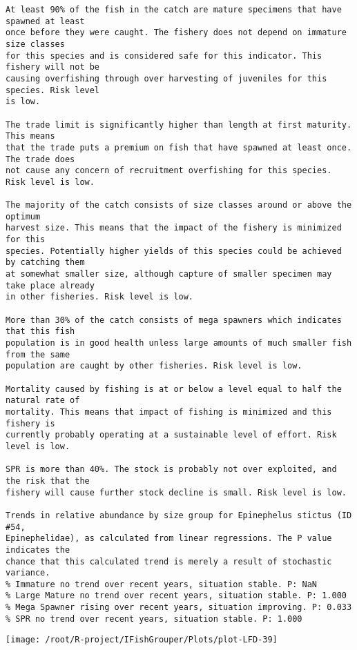 \documentclass{report}\usepackage[]{graphicx}\usepackage[]{color}
\makeatletter
\def\maxwidth{ %
  \ifdim\Gin@nat@width>\linewidth
    \linewidth
  \else
    \Gin@nat@width
  \fi
}
\newenvironment{kframe}{%
 \def\at@end@of@kframe{}%
 \ifinner\ifhmode%
  \def\at@end@of@kframe{\end{minipage}}%
  \begin{minipage}{\columnwidth}%
 \fi\fi%
 \def\FrameCommand##1{\hskip\@totalleftmargin \hskip-\fboxsep
 \colorbox{shadecolor}{##1}\hskip-\fboxsep
     \hskip-\linewidth \hskip-\@totalleftmargin \hskip\columnwidth}%
 \MakeFramed {\advance\hsize-\width
   \@totalleftmargin\z@ \linewidth\hsize
   \@setminipage}}%
 {\par\unskip\endMakeFramed%
 \at@end@of@kframe}
\newenvironment{knitrout}{}{} %
\makeatother
\begin{document}
\begin{knitrout}
\begin{kframe}
\begin{verbatim}
At least 90% of the fish in the catch are mature specimens that have spawned at least
once before they were caught. The fishery does not depend on immature size classes
for this species and is considered safe for this indicator. This fishery will not be
causing overfishing through over harvesting of juveniles for this species. Risk level
is low.

The trade limit is significantly higher than length at first maturity.  This means
that the trade puts a premium on fish that have spawned at least once. The trade does
not cause any concern of recruitment overfishing for this species. Risk level is low.

The majority of the catch consists of size classes around or above the optimum
harvest size. This means that the impact of the fishery is minimized for this
species. Potentially higher yields of this species could be achieved by catching them
at somewhat smaller size, although capture of smaller specimen may take place already
in other fisheries. Risk level is low.

More than 30% of the catch consists of mega spawners which indicates that this fish
population is in good health unless large amounts of much smaller fish from the same
population are caught by other fisheries. Risk level is low.
 
Mortality caused by fishing is at or below a level equal to half the natural rate of
mortality. This means that impact of fishing is minimized and this fishery is
currently probably operating at a sustainable level of effort. Risk level is low.
 
SPR is more than 40%. The stock is probably not over exploited, and the risk that the
fishery will cause further stock decline is small. Risk level is low.
 
Trends in relative abundance by size group for Epinephelus stictus (ID #54,
Epinephelidae), as calculated from linear regressions. The P value indicates the
chance that this calculated trend is merely a result of stochastic variance.
% Immature no trend over recent years, situation stable. P: NaN
% Large Mature no trend over recent years, situation stable. P: 1.000
% Mega Spawner rising over recent years, situation improving. P: 0.033
% SPR no trend over recent years, situation stable. P: 1.000
\end{verbatim}
\end{kframe}
\texttt{[image: /root/R-project/IFishGrouper/Plots/plot-LFD-39]} 


\end{knitrout}
\end{document}
